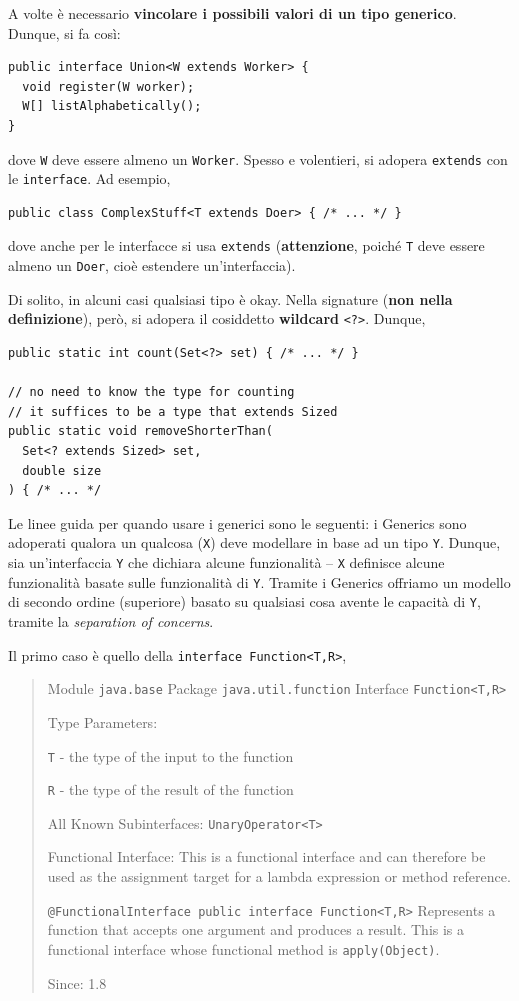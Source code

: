 \documentclass[\fontsizeclass,twocolumn]{\classname}
\theoremstyle{definition}
\theoremstyle{definition}
\begin{document}
A volte è necessario \textbf{vincolare i possibili valori di un tipo generico}.
Dunque, si fa così:

\begin{lstlisting}
public interface Union<W extends Worker> {
  void register(W worker);
  W[] listAlphabetically();
}
\end{lstlisting}

dove \texttt{W} deve essere almeno un \texttt{Worker}. Spesso e volentieri, si
adopera \texttt{extends} con le \texttt{interface}. Ad esempio,

\begin{lstlisting}
public class ComplexStuff<T extends Doer> { /* ... */ }
\end{lstlisting}

dove anche per le interfacce si usa \texttt{extends} (\textbf{attenzione},
poiché \texttt{T} deve essere almeno un \texttt{Doer}, cioè estendere
un'interfaccia).

Di solito, in alcuni casi qualsiasi tipo è okay. Nella signature (\textbf{non
nella definizione}), però, si adopera il cosiddetto \textbf{wildcard}
\texttt{<?>}. Dunque, 

\begin{lstlisting}
public static int count(Set<?> set) { /* ... */ }

// no need to know the type for counting
// it suffices to be a type that extends Sized
public static void removeShorterThan(
  Set<? extends Sized> set,
  double size
) { /* ... */
\end{lstlisting}

Le linee guida per quando usare i generici sono le seguenti: i Generics sono
adoperati qualora un qualcosa (\texttt{X}) deve modellare in base ad un tipo
\texttt{Y}. Dunque, sia un'interfaccia \texttt{Y} che dichiara alcune
funzionalità -- \texttt{X} definisce alcune funzionalità basate sulle
funzionalità di \texttt{Y}. Tramite i Generics offriamo un modello di secondo
ordine (superiore) basato su qualsiasi cosa avente le capacità di \texttt{Y},
tramite la \emph{separation of concerns}.

Il primo caso è quello della \texttt{interface Function<T,R>}, 
\begin{quote}
    \footnotesize{Module \texttt{java.base}
    Package \texttt{java.util.function}
    Interface \texttt{Function<T,R>}

Type Parameters:

    \texttt{T} - the type of the input to the function

    \texttt{R} - the type of the result of the function

All Known Subinterfaces:
    \texttt{UnaryOperator<T>}

Functional Interface:
This is a functional interface and can therefore be used as the assignment target for a lambda expression or method reference.

    \texttt{@FunctionalInterface
    public interface Function<T,R>}
Represents a function that accepts one argument and produces a result.
    This is a functional interface whose functional method is \texttt{apply(Object)}.

Since:
1.8
}
\end{quote}
\end{document}

